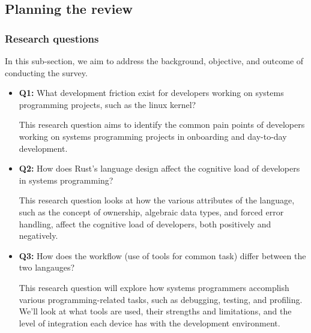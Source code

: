 \documentclass[conference]{IEEEtran}
\begin{document}
\subsection{Planning the review}
\subsubsection{Research questions}
\label{research_questions}

In this sub-section, we aim to address the background, objective, and outcome of conducting the survey.
\begin{itemize}
    \item \textbf{Q1:} {What development friction exist for developers working on systems programming projects, such as the linux kernel}?

          This research question aims to identify the common pain points of developers working on systems programming projects in onboarding and day-to-day development.

    \item \textbf{Q2:} {How does Rust's language design affect the cognitive load of developers in systems programming}?

          This research question looks at how the various attributes of the language, such as the concept of ownership, algebraic data types, and forced error handling, affect the cognitive load of developers, both positively and negatively.

    \item \textbf{Q3:} {How does the workflow (use of tools for common task) differ between the two langauges}?

          This research question will explore how systems programmers accomplish various programming-related tasks, such as debugging, testing, and profiling. We'll look at what tools are used, their strengths and limitations, and the level of integration each device has with the development environment.

\end{itemize}
\end{document}
